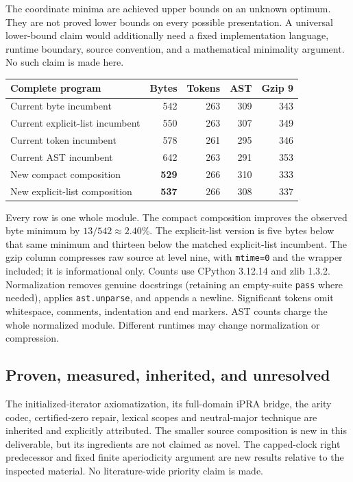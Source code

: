 The coordinate minima are achieved upper bounds on an unknown optimum.
They are not proved lower bounds on every possible presentation. A universal
lower-bound claim would additionally need a fixed implementation language,
runtime boundary, source convention, and a mathematical minimality argument.
No such claim is made here.

\begin{center}\small
\begin{tabular}{@{}lrrrr@{}}
\toprule
Complete program & Bytes & Tokens & AST & Gzip 9\\\midrule
Current byte incumbent & 542 & 263 & 309 & 343\\
Current explicit-list incumbent & 550 & 263 & 307 & 349\\
Current token incumbent & 578 & 261 & 295 & 346\\
Current AST incumbent & 642 & 263 & 291 & 353\\\midrule
New compact composition & \textbf{529} & 266 & 310 & 333\\
New explicit-list composition & \textbf{537} & 266 & 308 & 337\\
\bottomrule
\end{tabular}
\end{center}

Every row is one whole module. The compact composition improves the observed
byte minimum by $13/542\approx2.40\%$. The explicit-list version is five bytes
below that same minimum and thirteen below the matched explicit-list incumbent.
The gzip column compresses raw source at level nine, with \texttt{mtime=0}
and the wrapper included; it is informational only. Counts use CPython
3.12.14 and zlib 1.3.2. Normalization removes genuine docstrings (retaining an empty-suite
\texttt{pass} where needed), applies
\texttt{ast.unparse}, and appends a newline. Significant tokens omit whitespace,
comments, indentation and end markers. AST counts charge the whole normalized
module. Different runtimes may change normalization or compression.

\subsection{Proven, measured, inherited, and unresolved}

The initialized-iterator axiomatization, its full-domain iPRA bridge, the
arity codec, certified-zero repair, lexical scopes and neutral-major technique
are inherited and explicitly attributed. The smaller source composition is
new in this deliverable, but its ingredients are not claimed as novel.
The capped-clock right predecessor and fixed finite aperiodicity argument
are new results relative to the inspected material.
No literature-wide priority claim is made.

